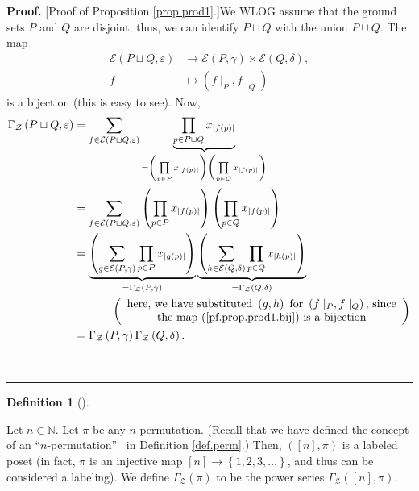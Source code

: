 \documentclass[numbers=enddot,12pt,final,onecolumn,notitlepage]{scrartcl}%
\theoremstyle{definition}
\newtheorem{defi}[theo]{Definition}
\newenvironment{definition}[1][]
{\begin{defi}[#1]\begin{leftbar}}
{\end{leftbar}\end{defi}}
\newenvironment{proof}[1][Proof]{\noindent\textbf{#1.} }{\ \rule{0.5em}{0.5em}}
\let\sumnonlimits\sum
\let\prodnonlimits\prod
\renewcommand{\sum}{\sumnonlimits\limits}
\renewcommand{\prod}{\prodnonlimits\limits}
\begin{document}
\begin{proof}
[Proof of Proposition \ref{prop.prod1}.]We WLOG assume that the ground sets
$P$ and $Q$ are disjoint; thus, we can identify $P\sqcup Q$ with the union
$P\cup Q$. The map%
\begin{align}
\mathcal{E}\left(  P\sqcup Q,\varepsilon\right)   &  \rightarrow
\mathcal{E}\left(  P,\gamma\right)  \times\mathcal{E}\left(  Q,\delta\right)
,\nonumber\\
f  &  \mapsto\left(  f\mid_{P},f\mid_{Q}\right)  \label{pf.prop.prod1.bij}%
\end{align}
is a bijection (this is easy to see). Now,%
\begin{align*}
\Gamma_{\mathcal{Z}}\left(  P\sqcup Q,\varepsilon\right)   &  =\sum
_{f\in\mathcal{E}\left(  P\sqcup Q,\varepsilon\right)  }\underbrace{\prod
_{p\in P\sqcup Q}x_{\left\vert f\left(  p\right)  \right\vert }}_{=\left(
\prod_{p\in P}x_{\left\vert f\left(  p\right)  \right\vert }\right)  \left(
\prod_{p\in Q}x_{\left\vert f\left(  p\right)  \right\vert }\right)  }\\
&  =\sum_{f\in\mathcal{E}\left(  P\sqcup Q,\varepsilon\right)  }\left(
\prod_{p\in P}x_{\left\vert f\left(  p\right)  \right\vert }\right)  \left(
\prod_{p\in Q}x_{\left\vert f\left(  p\right)  \right\vert }\right) \\
&  =\underbrace{\left(  \sum_{g\in\mathcal{E}\left(  P,\gamma\right)  }%
\prod_{p\in P}x_{\left\vert g\left(  p\right)  \right\vert }\right)
}_{=\Gamma_{\mathcal{Z}}\left(  P,\gamma\right)  }\underbrace{\left(
\sum_{h\in\mathcal{E}\left(  Q,\delta\right)  }\prod_{p\in Q}x_{\left\vert
h\left(  p\right)  \right\vert }\right)  }_{=\Gamma_{\mathcal{Z}}\left(
Q,\delta\right)  }\\
&  \ \ \ \ \ \ \ \ \ \ \left(
\begin{array}
[c]{c}%
\text{here, we have substituted }\left(  g,h\right)  \text{ for }\left(
f\mid_{P},f\mid_{Q}\right)  \text{, since}\\
\text{the map (\ref{pf.prop.prod1.bij}) is a bijection}%
\end{array}
\right) \\
&  =\Gamma_{\mathcal{Z}}\left(  P,\gamma\right)  \Gamma_{\mathcal{Z}}\left(
Q,\delta\right)  .
\end{align*}

\end{proof}

\begin{definition}
Let $n\in\mathbb{N}$. Let $\pi$ be any $n$-permutation. (Recall that we have
defined the concept of an \textquotedblleft$n$-permutation\textquotedblright%
\ in Definition \ref{def.perm}.) Then, $\left(  \left[  n\right]  ,\pi\right)
$ is a labeled poset (in fact, $\pi$ is an injective map $\left[  n\right]
\rightarrow\left\{  1,2,3,\ldots\right\}  $, and thus can be considered a
labeling). We define $\Gamma_{\mathcal{Z}}\left(  \pi\right)  $ to be the
power series $\Gamma_{\mathcal{Z}}\left(  \left[  n\right]  ,\pi\right)  $.
\end{definition}
\end{document}
